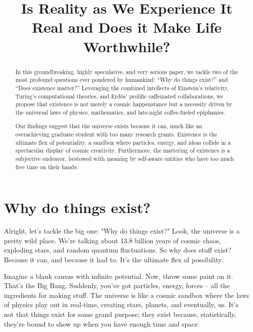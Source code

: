 \documentclass{Axon}
\title{Is Reality as We Experience It Real and Does it Make Life Worthwhile?}
\begin{document}
\maketitle
\makeauthor
\begin{abstract}
In this groundbreaking, highly speculative, and very serious paper, we tackle two of the most profound questions ever pondered by humankind: “Why do things exist?” and “Does existence matter?” Leveraging the combined intellects of Einstein’s relativity, Turing’s computational theories, and Erdös’ prolific caffeinated collaborations, we propose that existence is not merely a cosmic happenstance but a necessity driven by the universal laws of physics, mathematics, and late-night coffee-fueled epiphanies.

Our findings suggest that the universe exists because it can, much like an overachieving graduate student with too many research grants. Existence is the ultimate flex of potentiality, a sandbox where particles, energy, and ideas collide in a spectacular display of cosmic creativity. Furthermore, the mattering of existence is a subjective endeavor, bestowed with meaning by self-aware entities who have too much free time on their hands.
\end{abstract}
\section{Why do things exist?}
Alright, let's tackle the big one: "Why do things exist?" Look, the universe is a pretty wild place. We're talking about 13.8 billion years of cosmic chaos, exploding stars, and random quantum fluctuations. So why does stuff exist? Because it can, and because it had to. It's the ultimate flex of possibility.

Imagine a blank canvas with infinite potential. Now, throw some paint on it. That's the Big Bang. Suddenly, you've got particles, energy, forces – all the ingredients for making stuff. The universe is like a cosmic sandbox where the laws of physics play out in real-time, creating stars, planets, and eventually, us. It’s not that things exist for some grand purpose; they exist because, statistically, they’re bound to show up when you have enough time and space.
\end{document}
